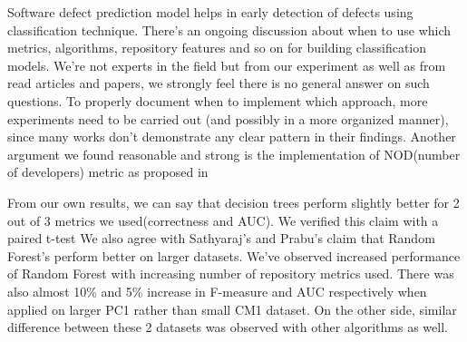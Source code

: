 Software defect prediction model helps in early detection of defects using classification technique. There's an ongoing discussion about when to use which metrics, algorithms, repository features and so on for building classification models. We're not experts in the field but from our experiment as well as from read articles and papers, we strongly feel there is no general answer on such questions. To properly document when to implement which approach, more experiments need to be carried out (and possibly in a more organized manner), since many works don't demonstrate any clear pattern in their findings. Another argument we found reasonable and strong is the implementation of NOD(number of developers) metric as proposed in 

From our own results, we can say that decision trees perform slightly better for 2 out of 3 metrics we used(correctness and AUC).  We verified this claim with a paired t-test We also agree with Sathyaraj's and Prabu's claim\cite{sathyaraj2015approach} that Random Forest's perform better on larger datasets. We've observed increased performance of Random Forest with increasing number of repository metrics used. There was also almost 10\% and 5\% increase in F-measure and AUC respectively when applied on larger PC1 rather than small CM1 dataset. On the other side, similar difference between these 2 datasets was observed with other algorithms as well.